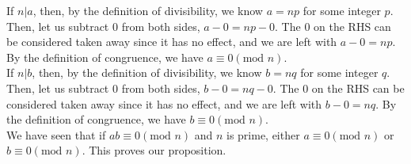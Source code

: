 \documentclass[12pt]{article}
\newenvironment{problem}[2][Problem]{\begin{trivlist}
\item[\hskip \labelsep {\bfseries #1}\hskip \labelsep {\bfseries #2.}]}{\end{trivlist}}
\begin{document}
\begin{problem}{5}
\begin{enumerate}[label=(\alph*)]
If $n|a$, then, by the definition of divisibility, we know $a=np$ for some integer $p$. Then, let us subtract $0$ from both sides, $a-0=np-0$. The $0$ on the RHS can be considered taken away since it has no effect, and we are left with $a-0=np$. By the definition of congruence, we have $a \equiv 0 (\text{mod }n)$. \\

If $n|b$, then, by the definition of divisibility, we know $b=nq$ for some integer $q$. Then, let us subtract $0$ from both sides, $b-0=nq-0$. The $0$ on the RHS can be considered taken away since it has no effect, and we are left with $b-0=nq$. By the definition of congruence, we have $b \equiv 0 (\text{mod }n)$. \\

We have seen that if $ab \equiv 0 (\text{mod }n)$ and $n$ is prime, either $a \equiv 0 (\text{mod }n)$ or $b \equiv 0 (\text{mod }n)$. This proves our proposition. \qedsymbol
\end{enumerate}
\end{problem}
\end{document}
